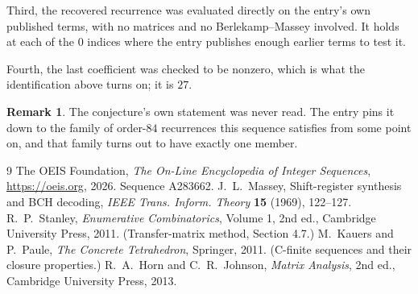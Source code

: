 \documentclass[11pt,a4paper]{article}
\theoremstyle{plain}
\theoremstyle{definition}
\newtheorem{remark}[theorem]{Remark}
\begin{document}
Third, the recovered recurrence was evaluated directly on the entry's own published terms, with
no matrices and no Berlekamp--Massey involved. It holds at each of the $0$ indices where
the entry publishes enough earlier terms to test it.

Fourth, the last coefficient was checked to be nonzero, which is what the identification above
turns on; it is $27$.

\begin{remark}
The conjecture's own statement was never read. The entry pins it down to the family of
order-$84$ recurrences this sequence satisfies from some point on, and that family turns
out to have exactly one member.
\end{remark}

\begin{thebibliography}{9}
 The OEIS Foundation, \emph{The On-Line Encyclopedia of Integer
Sequences}, \url{https://oeis.org}, 2026. Sequence A283662.
 J.~L.~Massey, Shift-register synthesis and BCH decoding, \emph{IEEE
Trans. Inform. Theory} \textbf{15} (1969), 122--127.
 R.~P.~Stanley, \emph{Enumerative Combinatorics}, Volume 1, 2nd ed.,
Cambridge University Press, 2011. (Transfer-matrix method, Section 4.7.)
 M.~Kauers and P.~Paule, \emph{The Concrete Tetrahedron}, Springer, 2011.
(C-finite sequences and their closure properties.)
 R.~A.~Horn and C.~R.~Johnson, \emph{Matrix Analysis}, 2nd ed., Cambridge
University Press, 2013.
\end{thebibliography}
\end{document}
